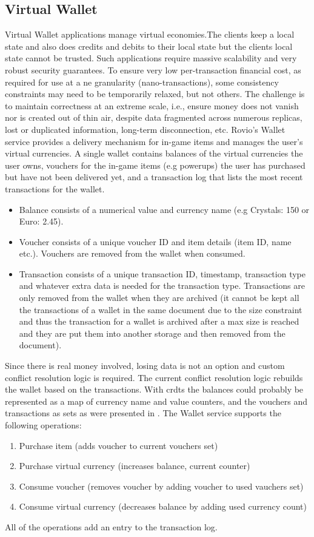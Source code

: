 \subsection{Virtual Wallet}
Virtual Wallet applications manage virtual economies.The clients keep a local state and also does credits and debits to their local state but the clients local state cannot be trusted. Such applications require massive scalability and very robust security guarantees. To ensure very low per-transaction financial cost, as required for use at a ne granularity (nano-transactions), some consistency constraints may need to be temporarily relaxed, but not others. The challenge is to maintain correctness at an extreme scale, i.e., ensure money does not vanish nor is created out of thin air, despite data fragmented across numerous replicas, lost or duplicated information, long-term disconnection, etc. Rovio's Wallet service provides a delivery mechanism for in-game items and manages the user's virtual currencies. A single wallet contains balances of the virtual currencies the user owns, vouchers for the in-game items (e.g powerups) the user has purchased but have not been delivered yet, and a transaction log that lists the most recent transactions for the wallet.
\begin{itemize}
	\item Balance consists of a numerical value and currency name (e.g Crystals: 150 or Euro: 2.45). 
	\item Voucher consists of a unique voucher ID and item details (item ID, name etc.). Vouchers are removed from the wallet when consumed. 
	\item Transaction consists of a unique transaction ID, timestamp, transaction type and whatever extra data is needed for the transaction type. Transactions are only removed from the wallet when they are archived (it cannot be	kept all the transactions of a wallet in the same document due to the size constraint and thus the transaction for a wallet is archived after a max size is reached and they are put them into another storage and then removed from the document).
\end{itemize}
Since there is real money involved, losing data is not an option and custom conflict resolution logic is required. The current conflict resolution logic rebuilds the wallet based on the transactions. With \glspl{crdt} the balances could probably be represented as a map of currency name and value counters, and the vouchers and transactions as sets as were presented in \cite{shapiro11conflictfree}. The Wallet service supports the following operations: 
\begin{enumerate}
	\item Purchase item (adds voucher to current vouchers set)
	\item Purchase virtual currency (increases balance, current counter)
	\item Consume voucher (removes voucher by adding voucher to used vauchers set)
	\item Consume virtual currency (decreases balance by adding used currency count)
\end{enumerate}
All of the operations add an entry to the transaction log.



